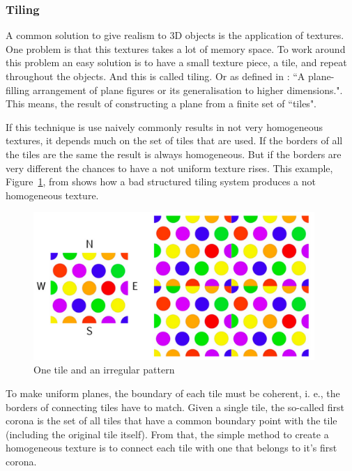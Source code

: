 
\subsubsection{Tiling} %
\label{ssub:tiling}

A common solution to give realism to 3D objects is the application of textures. One problem is that this textures takes a lot of memory space. To work around this problem an easy solution is to have a small texture piece, a tile, and repeat throughout the objects. And this is called tiling. Or as defined in \cite{TilingWOLFRAM}: ``A plane-filling arrangement of plane figures or its generalisation to higher dimensions.".  This means, the result of constructing a plane from a finite set of ``tiles". 

If this technique is use naively commonly results in not very homogeneous textures, it depends much on the set of tiles that are used. If the borders of all the tiles are the same the result is always homogeneous. But if the borders are very different the chances to have a not uniform texture rises. This example, Figure~\ref{fig:TIrregulartexture}, from \cite{ProcWorld} shows how a bad structured tiling system produces a not homogeneous texture.  


\begin{figure}[htbp]
	\centering
	\includegraphics[width=0.95\textwidth]{img/Theory/Tiling/iregular.png}
	\caption{One tile and an irregular pattern}
	\label{fig:TIrregulartexture}
\end{figure}


To make uniform planes, the boundary of each tile must be coherent, i. e., the borders of connecting tiles have to match. Given a single tile, the so-called first corona is the set of all tiles that have a common boundary point with the tile (including the original tile itself). From that, the simple method to create a homogeneous texture is to connect each tile with one that belongs to it's first corona.

